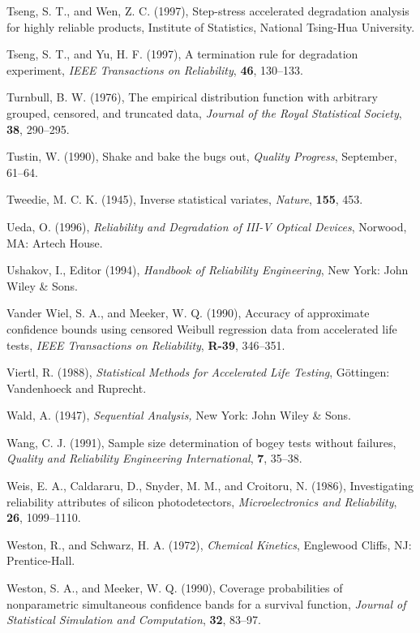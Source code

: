 \begin{thebibliography}{999}
Tseng, S. T., and Wen, Z. C. (1997), Step-stress accelerated
degradation analysis for highly reliable products, Institute of
Statistics, National Tsing-Hua University.

Tseng, S. T., and Yu, H. F. (1997), A termination rule for
degradation experiment, {\em IEEE Transactions on Reliability}, {\bf
46}, 130--133.

Turnbull, B. W. (1976), The empirical distribution function with
arbitrary grouped, censored, and truncated data, {\em Journal of the
Royal Statistical Society}, {\bf 38}, 290--295.

Tustin, W. (1990), Shake and bake the bugs out, {\em Quality
Progress}, September, 61--64.

Tweedie, M. C. K. (1945), Inverse statistical variates, {\em Nature},
{\bf 155}, 453.

Ueda, O. (1996), {\em Reliability and Degradation of III-V Optical Devices}, 
Norwood, MA: Artech House.

Ushakov, I., Editor (1994), {\em Handbook of Reliability
Engineering}, New York: John Wiley \& Sons.

Vander Wiel, S. A., and Meeker, W. Q. (1990), Accuracy of approximate
confidence bounds using censored Weibull regression data from
accelerated life tests, {\em IEEE Transactions on Reliability}, {\bf
R-39}, 346--351.

Viertl, R. (1988), {\em Statistical Methods for Accelerated Life
Testing}, G\"{o}ttingen: Vandenhoeck and Ruprecht.

Wald, A. (1947), {\em Sequential Analysis, } New York: John Wiley \&
Sons.
  
Wang, C. J. (1991), Sample size determination of bogey tests without
failures, {\em Quality and Reliability Engineering International},
{\bf 7}, 35--38.
 
Weis, E. A., Caldararu, D., Snyder, M. M., and Croitoru, N. (1986),
Investigating reliability attributes of silicon photodetectors, {\em
Microelectronics and Reliability}, {\bf 26}, 1099--1110.

Weston, R., and Schwarz, H. A. (1972), {\em Chemical Kinetics},
Englewood Cliffs, NJ: Prentice-Hall.

Weston, S. A., and Meeker, W. Q. (1990), Coverage probabilities of
nonparametric simultaneous confidence bands for a survival function,
{\em Journal of Statistical Simulation and Computation}, {\bf 32},
83--97.
 

\end{thebibliography}
